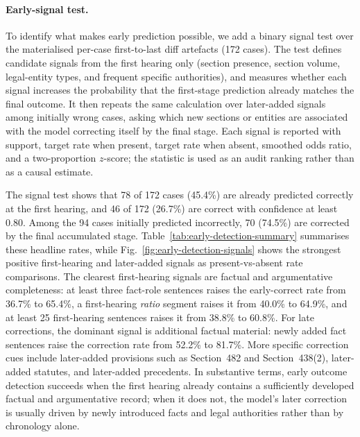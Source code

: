\documentclass[runningheads]{llncs}
\begin{document}
\paragraph{Early-signal test.}
To identify what makes early prediction possible, we add a binary signal test over the materialised per-case first-to-last diff artefacts (172 cases). The test defines candidate signals from the first hearing only (section presence, section volume, legal-entity types, and frequent specific authorities), and measures whether each signal increases the probability that the first-stage prediction already matches the final outcome. It then repeats the same calculation over later-added signals among initially wrong cases, asking which new sections or entities are associated with the model correcting itself by the final stage. Each signal is reported with support, target rate when present, target rate when absent, smoothed odds ratio, and a two-proportion $z$-score; the statistic is used as an audit ranking rather than as a causal estimate.

The signal test shows that 78 of 172 cases (45.4\%) are already predicted correctly at the first hearing, and 46 of 172 (26.7\%) are correct with confidence at least 0.80. Among the 94 cases initially predicted incorrectly, 70 (74.5\%) are corrected by the final accumulated stage. Table~\ref{tab:early-detection-summary} summarises these headline rates, while Fig.~\ref{fig:early-detection-signals} shows the strongest positive first-hearing and later-added signals as present-vs-absent rate comparisons. The clearest first-hearing signals are factual and argumentative completeness: at least three fact-role sentences raises the early-correct rate from 36.7\% to 65.4\%, a first-hearing \emph{ratio} segment raises it from 40.0\% to 64.9\%, and at least 25 first-hearing sentences raises it from 38.8\% to 60.8\%. For late corrections, the dominant signal is additional factual material: newly added fact sentences raise the correction rate from 52.2\% to 81.7\%. More specific correction cues include later-added provisions such as Section~482 and Section~438(2), later-added statutes, and later-added precedents. In substantive terms, early outcome detection succeeds when the first hearing already contains a sufficiently developed factual and argumentative record; when it does not, the model's later correction is usually driven by newly introduced facts and legal authorities rather than by chronology alone.
\end{document}
